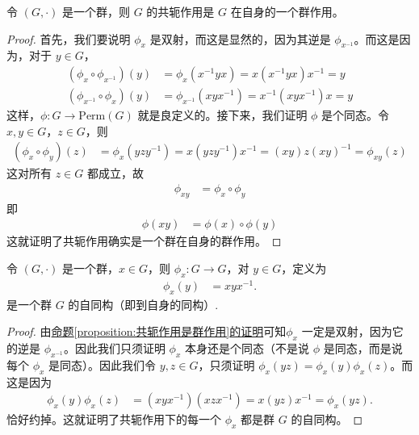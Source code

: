 \documentclass[../../main.tex]{subfiles}
\begin{document}
\begin{proposition}\label{proposition:共轭作用是群作用}
令 \((G, \cdot)\) 是一个群，则 \(G\) 的共轭作用是 \(G\) 在自身的一个群作用。
\end{proposition}
\begin{proof}
首先，我们要说明 \(\phi_x\) 是双射，而这是显然的，因为其逆是 \(\phi_{x^{-1}}\)。而这是因为，对于 \(y \in G\)，
\begin{align*}
(\phi_x \circ \phi_{x^{-1}})(y) &= \phi_x(x^{-1}yx) = x(x^{-1}yx)x^{-1} = y\\
(\phi_{x^{-1}} \circ \phi_x)(y) &= \phi_{x^{-1}}(xyx^{-1}) = x^{-1}(xyx^{-1})x = y
\end{align*}
这样，\(\phi: G \to \mathrm{Perm}(G)\) 就是良定义的。接下来，我们证明 \(\phi\) 是个同态。令 \(x, y \in G\)，\(z \in G\)，则
\begin{align*}
(\phi_x \circ \phi_y)(z) &= \phi_x(yzy^{-1}) = x(yzy^{-1})x^{-1} = (xy)z(xy)^{-1} = \phi_{xy}(z)
\end{align*}
这对所有 \(z \in G\) 都成立，故
\begin{align*}
\phi_{xy} &= \phi_x \circ \phi_y
\end{align*}
即
\begin{align*}
\phi(xy) &= \phi(x) \circ \phi(y)
\end{align*}
这就证明了共轭作用确实是一个群在自身的群作用。 
\end{proof}

\begin{proposition}
令 \((G, \cdot)\) 是一个群，\(x \in G\)，则 \(\phi_x: G \to G\)，对 \(y \in G\)，定义为
\begin{align*}
\phi_x(y) &= xyx^{-1} .
\end{align*}
是一个群 \(G\) 的自同构（即到自身的同构）.
\end{proposition}
\begin{proof}
由\hyperref[proposition:共轭作用是群作用]{命题\ref{proposition:共轭作用是群作用}的证明}可知\(\phi_x\) 一定是双射，因为它的逆是 \(\phi_{x^{-1}}\)。因此我们只须证明 \(\phi_x\) 本身还是个同态（不是说 \(\phi\) 是同态，而是说每个 \(\phi_x\) 是同态）。因此我们令 \(y, z \in G\)，只须证明 \(\phi_x(yz) = \phi_x(y)\phi_x(z)\)。而这是因为
\begin{align*}
\phi_x(y)\phi_x(z) &= (xyx^{-1})(xzx^{-1}) = x(yz)x^{-1} = \phi_x(yz).
\end{align*}
恰好约掉。这就证明了共轭作用下的每一个 \(\phi_x\) 都是群 \(G\) 的自同构。 
\end{proof}
\end{document}
